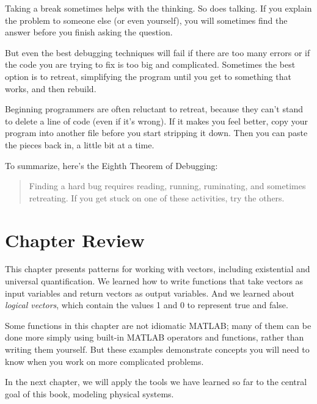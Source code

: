 \documentclass[../../book.tex]{subfiles}
\begin{document}
Taking a break sometimes helps with the thinking.  So does talking.
If you explain the problem to someone else (or even yourself), you
will sometimes find the answer before you finish asking the question.

But even the best debugging techniques will fail if there are too many
errors or if the code you are trying to fix is too big and
complicated.  Sometimes the best option is to retreat, simplifying the
program until you get to something that works, and then rebuild.

Beginning programmers are often reluctant to retreat, because
they can't stand to delete a line of code (even if it's wrong).
If it makes you feel better, copy your program into another file
before you start stripping it down.  Then you can paste the pieces
back in, a little bit at a time.


To summarize, here's the Eighth Theorem of Debugging:

\begin{quote}
Finding a hard bug requires reading, running, ruminating,
and sometimes retreating.  If you get stuck on one of these
activities, try the others.
\end{quote}

\section{Chapter Review}

This chapter presents patterns for working with vectors, including existential and universal quantification.
We learned how to write functions that take vectors as input variables and return vectors as output variables.
And we learned about \emph{logical vectors}, which contain the values 1 and 0 to represent true and false.

Some functions in this chapter are not idiomatic MATLAB; many of them can be done more simply using built-in MATLAB operators and functions, rather than writing them yourself.  But these examples demonstrate concepts you will need to know when you work on more complicated problems.

In the next chapter, we will apply the tools we have learned so far to the central goal of this book, modeling physical systems.





\end{document}
